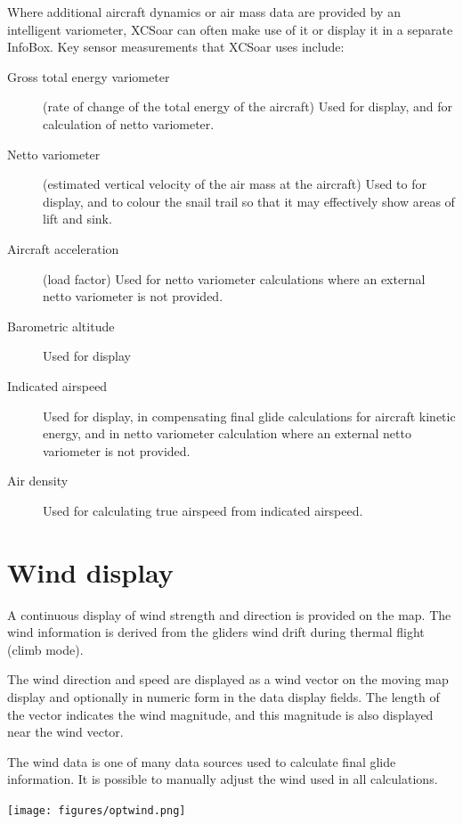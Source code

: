Where additional aircraft dynamics or air mass data are provided by an
intelligent variometer, XCSoar can often make use of it or display it
in a separate InfoBox.  Key sensor measurements that XCSoar uses include:
\begin{description}
\item[Gross total energy variometer] (rate of change of the total energy of
 the aircraft)  Used for display, and for calculation of netto variometer.
\item[Netto variometer] (estimated vertical velocity of the air mass at
 the aircraft)  Used to for display, and to colour the snail trail
 so that it may effectively show areas of lift and sink.
\item[Aircraft acceleration] (load factor)  Used for netto variometer
  calculations where an external netto variometer is not provided.
\item[Barometric altitude] Used for display
\item[Indicated airspeed] Used for display, in compensating final glide
  calculations for aircraft kinetic energy, and in netto variometer
  calculation where an external netto variometer is not provided.
\item[Air density] Used for calculating true airspeed from indicated
  airspeed.
\end{description}

\section{Wind display}

A continuous display of wind strength and direction is provided on the
map.  The wind information is derived from the gliders wind drift
during thermal flight (climb mode).

The wind direction and speed are displayed as a wind vector on the
moving map display and optionally in numeric form in the data display
fields.  The length of the vector indicates the wind magnitude, and
this magnitude is also displayed near the wind vector.

The wind data is one of many data sources used to calculate final
glide information.  It is possible to manually adjust the wind used in
all calculations.

\begin{center}
\texttt{[image: figures/optwind.png]}


\end{center}

